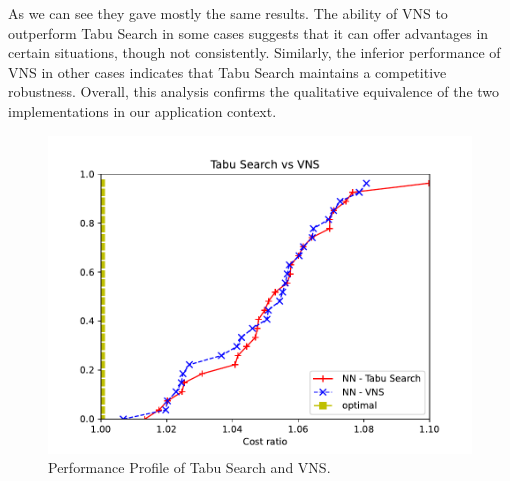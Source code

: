 As we can see they gave mostly the same results. The ability of VNS to outperform Tabu Search in some cases suggests that it can offer advantages in certain situations, though not consistently. Similarly, the inferior performance of VNS in other cases indicates that Tabu Search maintains a competitive robustness. Overall, this analysis confirms the qualitative equivalence of the two implementations in our application context.

\begin{figure}[H]
    \centering
    \includegraphics[width=0.7\linewidth]{Immagini/Tabu vs VNS.pdf}
    \caption{Performance Profile of Tabu Search and VNS.}
    \label{fig:tabu_vns}
\end{figure}
